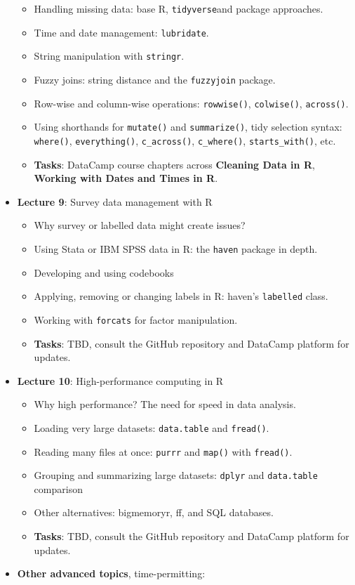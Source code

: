 \documentclass[
  letterpaper,
  DIV=11,
  numbers=noendperiod]{scrartcl}
\providecommand{\tightlist}{%
  \setlength{\itemsep}{0pt}\setlength{\parskip}{0pt}}\usepackage{longtable,booktabs,array}
\begin{document}
\begin{itemize}
  \begin{itemize}
  \tightlist
  \item
    Handling missing data: base R, \texttt{tidyverse}and package
    approaches.
  \item
    Time and date management: \texttt{lubridate}.
  \item
    String manipulation with \texttt{stringr}.
  \item
    Fuzzy joins: string distance and the \texttt{fuzzyjoin} package.
  \item
    Row-wise and column-wise operations: \texttt{rowwise()},
    \texttt{colwise()}, \texttt{across()}.
  \item
    Using shorthands for \texttt{mutate()} and \texttt{summarize()},
    tidy selection syntax: \texttt{where()}, \texttt{everything()},
    \texttt{c\_across()}, \texttt{c\_where()}, \texttt{starts\_with()},
    etc.
  \item
    \textbf{Tasks}: DataCamp course chapters across \textbf{Cleaning
    Data in R}, \textbf{Working with Dates and Times in R}.
  \end{itemize}
\item
  \textbf{Lecture 9}: Survey data management with R

  \begin{itemize}
  \tightlist
  \item
    Why survey or labelled data might create issues?
  \item
    Using Stata or IBM SPSS data in R: the \texttt{haven} package in
    depth.
  \item
    Developing and using codebooks
  \item
    Applying, removing or changing labels in R: haven's
    \texttt{labelled} class.
  \item
    Working with \texttt{forcats} for factor manipulation.
  \item
    \textbf{Tasks}: TBD, consult the GitHub repository and DataCamp
    platform for updates.
  \end{itemize}
\item
  \textbf{Lecture 10}: High-performance computing in R

  \begin{itemize}
  \tightlist
  \item
    Why high performance? The need for speed in data analysis.
  \item
    Loading very large datasets: \texttt{data.table} and
    \texttt{fread()}.
  \item
    Reading many files at once: \texttt{purrr} and \texttt{map()} with
    \texttt{fread()}.
  \item
    Grouping and summarizing large datasets: \texttt{dplyr} and
    \texttt{data.table} comparison
  \item
    Other alternatives: bigmemoryr, ff, and SQL databases.
  \item
    \textbf{Tasks}: TBD, consult the GitHub repository and DataCamp
    platform for updates.
  \end{itemize}
\item
  \textbf{Other advanced topics}, time-permitting:


\end{itemize}
\end{document}
